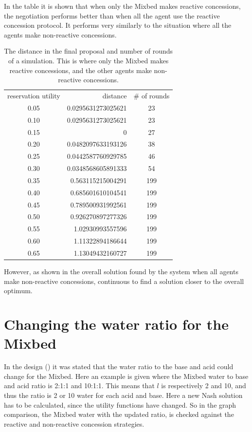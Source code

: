 In the table it is shown that when only the Mixbed makes reactive concessions, the negotiation performs better than when all the agent use the reactive concession protocol. It performs very similarly to the situation where all the agents make non-reactive concessions.
\begin{table}[h]
	\centering
\begin{tabular}{c n{1}{4} c }
	\toprule 
	reservation utility	& {distance} & \# of rounds \\ 
	\cmidrule(r){1-1}
	\cmidrule(r){2-3}
	 
	0.05&	0.0295631273025621	&23\\
	0.10&	0.0295631273025621	&23\\
	0.15&	0	&27\\
	0.20&	0.0482097633193126	&38\\
	0.25&	0.0442587760929785	&46\\
	0.30&	0.0348568605891333	&54\\
	0.35&	0.563115215004291	&199\\
	0.40&	0.685601610104541	&199\\
	0.45&	0.789500931992561	&199\\
	0.50&	0.926270897277326	&199\\
	0.55&	1.02930993557596	&199\\
	0.60&	1.11322894186644	&199\\
	0.65&	1.13049432160727	&199\\
	\bottomrule
\end{tabular} 
\caption{The distance in the final proposal and number of rounds of a simulation. This is where only the Mixbed makes reactive concessions, and the other agents make non-reactive concessions. }
\label{tab:reactivevsnon-reactivevsMixbedrea}
\end{table}
\npnoround
However, as shown in  the overall solution found by the system when all agents make non-reactive concessions, continuous to find a solution closer to the overall optimum.
\clearpage
\section{Changing the water ratio for the Mixbed}
In the design () it was stated that the water ratio to the base and acid could change for the Mixbed. Here an example is given where the Mixbed water to base and acid ratio is 2:1:1 and 10:1:1. This means that $l$ is respectively 2 and 10, and thus the ratio is 2 or 10 water for each acid and base. Here a new Nash solution has to be calculated, since the utility functions have changed. So in the graph comparison, the Mixbed water with the updated ratio, is checked against the reactive and non-reactive concession strategies.

